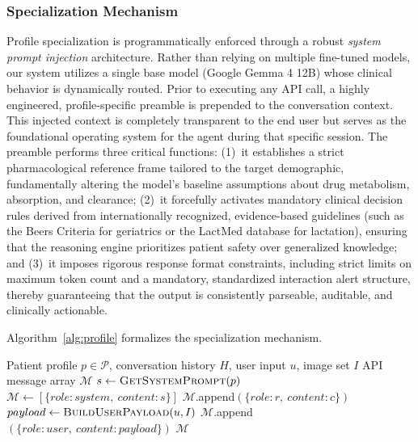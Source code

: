 \documentclass[9pt,conference]{IEEEtran}
\begin{document}
\subsubsection{Specialization Mechanism}

Profile specialization is programmatically enforced through a robust \textit{system prompt injection} architecture. Rather than relying on multiple fine-tuned models, our system utilizes a single base model (Google Gemma 4 12B) whose clinical behavior is dynamically routed. Prior to executing any API call, a highly engineered, profile-specific preamble is prepended to the conversation context. This injected context is completely transparent to the end user but serves as the foundational operating system for the agent during that specific session. The preamble performs three critical functions: (1)~it establishes a strict pharmacological reference frame tailored to the target demographic, fundamentally altering the model's baseline assumptions about drug metabolism, absorption, and clearance; (2)~it forcefully activates mandatory clinical decision rules derived from internationally recognized, evidence-based guidelines (such as the Beers Criteria for geriatrics or the LactMed database for lactation), ensuring that the reasoning engine prioritizes patient safety over generalized knowledge; and (3)~it imposes rigorous response format constraints, including strict limits on maximum token count and a mandatory, standardized interaction alert structure, thereby guaranteeing that the output is consistently parseable, auditable, and clinically actionable.


\newpage

Algorithm~\ref{alg:profile} formalizes the specialization mechanism.

\begin{algorithm}[H]
\caption{Profile-Driven System Prompt Construction}
\label{alg:profile}
\begin{algorithmic}[1]
\Require Patient profile $p \in \mathcal{P}$, conversation history $H$,
         user input $u$, image set $I$
\Ensure API message array $\mathcal{M}$
\State $s \gets \textsc{GetSystemPrompt}(p)$
\State $\mathcal{M} \gets [\{role{:}system,\ content{:}s\}]$
  \State $\mathcal{M}$.append$(\{role{:}r,\ content{:}c\})$
\EndFor
\State $payload \gets \textsc{BuildUserPayload}(u, I)$
\State $\mathcal{M}$.append$(\{role{:}user,\ content{:}payload\})$
\State \Return $\mathcal{M}$
\end{algorithmic}
\end{algorithm}
\end{document}
